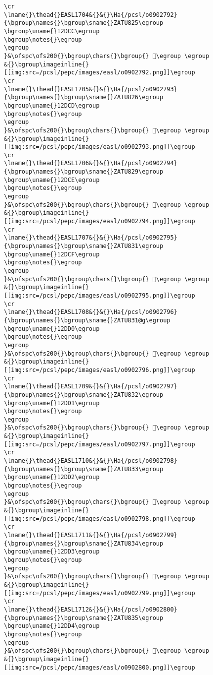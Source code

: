 \begin{verbatim}
\cr
\lname{}\thead{}EASL1704&{}&{}\Ha{/pcsl/o0902792}{\bgroup\names{}\bgroup\sname{}ZATU825\egroup
\bgroup\uname{}12DCC\egroup
\bgroup\notes{}\egroup
\egroup
}&\ofspc\ofs200{}\bgroup\chars{}\bgroup{} 𒷌\egroup \egroup
&{}\bgroup\imageinline{}[[img:src=/pcsl/pepc/images/easl/o0902792.png]]\egroup
\cr
\lname{}\thead{}EASL1705&{}&{}\Ha{/pcsl/o0902793}{\bgroup\names{}\bgroup\sname{}ZATU826\egroup
\bgroup\uname{}12DCD\egroup
\bgroup\notes{}\egroup
\egroup
}&\ofspc\ofs200{}\bgroup\chars{}\bgroup{} 𒷍\egroup \egroup
&{}\bgroup\imageinline{}[[img:src=/pcsl/pepc/images/easl/o0902793.png]]\egroup
\cr
\lname{}\thead{}EASL1706&{}&{}\Ha{/pcsl/o0902794}{\bgroup\names{}\bgroup\sname{}ZATU829\egroup
\bgroup\uname{}12DCE\egroup
\bgroup\notes{}\egroup
\egroup
}&\ofspc\ofs200{}\bgroup\chars{}\bgroup{} 𒷎\egroup \egroup
&{}\bgroup\imageinline{}[[img:src=/pcsl/pepc/images/easl/o0902794.png]]\egroup
\cr
\lname{}\thead{}EASL1707&{}&{}\Ha{/pcsl/o0902795}{\bgroup\names{}\bgroup\sname{}ZATU831\egroup
\bgroup\uname{}12DCF\egroup
\bgroup\notes{}\egroup
\egroup
}&\ofspc\ofs200{}\bgroup\chars{}\bgroup{} 𒷏\egroup \egroup
&{}\bgroup\imageinline{}[[img:src=/pcsl/pepc/images/easl/o0902795.png]]\egroup
\cr
\lname{}\thead{}EASL1708&{}&{}\Ha{/pcsl/o0902796}{\bgroup\names{}\bgroup\sname{}ZATU831@g\egroup
\bgroup\uname{}12DD0\egroup
\bgroup\notes{}\egroup
\egroup
}&\ofspc\ofs200{}\bgroup\chars{}\bgroup{} 𒷐\egroup \egroup
&{}\bgroup\imageinline{}[[img:src=/pcsl/pepc/images/easl/o0902796.png]]\egroup
\cr
\lname{}\thead{}EASL1709&{}&{}\Ha{/pcsl/o0902797}{\bgroup\names{}\bgroup\sname{}ZATU832\egroup
\bgroup\uname{}12DD1\egroup
\bgroup\notes{}\egroup
\egroup
}&\ofspc\ofs200{}\bgroup\chars{}\bgroup{} 𒷑\egroup \egroup
&{}\bgroup\imageinline{}[[img:src=/pcsl/pepc/images/easl/o0902797.png]]\egroup
\cr
\lname{}\thead{}EASL1710&{}&{}\Ha{/pcsl/o0902798}{\bgroup\names{}\bgroup\sname{}ZATU833\egroup
\bgroup\uname{}12DD2\egroup
\bgroup\notes{}\egroup
\egroup
}&\ofspc\ofs200{}\bgroup\chars{}\bgroup{} 𒷒\egroup \egroup
&{}\bgroup\imageinline{}[[img:src=/pcsl/pepc/images/easl/o0902798.png]]\egroup
\cr
\lname{}\thead{}EASL1711&{}&{}\Ha{/pcsl/o0902799}{\bgroup\names{}\bgroup\sname{}ZATU834\egroup
\bgroup\uname{}12DD3\egroup
\bgroup\notes{}\egroup
\egroup
}&\ofspc\ofs200{}\bgroup\chars{}\bgroup{} 𒷓\egroup \egroup
&{}\bgroup\imageinline{}[[img:src=/pcsl/pepc/images/easl/o0902799.png]]\egroup
\cr
\lname{}\thead{}EASL1712&{}&{}\Ha{/pcsl/o0902800}{\bgroup\names{}\bgroup\sname{}ZATU835\egroup
\bgroup\uname{}12DD4\egroup
\bgroup\notes{}\egroup
\egroup
}&\ofspc\ofs200{}\bgroup\chars{}\bgroup{} 𒷔\egroup \egroup
&{}\bgroup\imageinline{}[[img:src=/pcsl/pepc/images/easl/o0902800.png]]\egroup

\end{verbatim}
